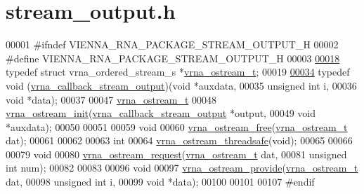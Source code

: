 \hypertarget{stream__output_8h_source}{}\section{stream\+\_\+output.\+h}
\label{stream__output_8h_source}

\begin{DoxyCode}
00001 \textcolor{preprocessor}{#ifndef VIENNA\_RNA\_PACKAGE\_STREAM\_OUTPUT\_H}
00002 \textcolor{preprocessor}{#define VIENNA\_RNA\_PACKAGE\_STREAM\_OUTPUT\_H}
00003 
\mbox{\hyperlink{group__buffer__utils_ga8da189552af21ab6e4e88bdcc240870c}{00018}} \textcolor{keyword}{typedef} \textcolor{keyword}{struct }vrna\_ordered\_stream\_s *\mbox{\hyperlink{group__buffer__utils_ga8da189552af21ab6e4e88bdcc240870c}{vrna\_ostream\_t}};
00019 
\mbox{\hyperlink{group__buffer__utils_ga4adb94338a6f0a1a451e03c1bdac0d9d}{00034}} \textcolor{keyword}{typedef} void (\mbox{\hyperlink{group__buffer__utils_ga4adb94338a6f0a1a451e03c1bdac0d9d}{vrna\_callback\_stream\_output}})(\textcolor{keywordtype}{void}         *auxdata,
00035                                            \textcolor{keywordtype}{unsigned} \textcolor{keywordtype}{int} i,
00036                                            \textcolor{keywordtype}{void}         *data);
00037 
00047 \mbox{\hyperlink{group__buffer__utils_ga8da189552af21ab6e4e88bdcc240870c}{vrna\_ostream\_t}}
00048 \mbox{\hyperlink{group__buffer__utils_gad23113e66a0910ec2341856e2da56bf6}{vrna\_ostream\_init}}(\mbox{\hyperlink{group__buffer__utils_ga4adb94338a6f0a1a451e03c1bdac0d9d}{vrna\_callback\_stream\_output}} *output,
00049                   \textcolor{keywordtype}{void}                        *auxdata);
00050 
00051 
00059 \textcolor{keywordtype}{void}
00060 \mbox{\hyperlink{group__buffer__utils_gaf813ec90e1446ba82c89f9a39688a3b3}{vrna\_ostream\_free}}(\mbox{\hyperlink{group__buffer__utils_ga8da189552af21ab6e4e88bdcc240870c}{vrna\_ostream\_t}} dat);
00061 
00062 
00063 \textcolor{keywordtype}{int}
00064 \mbox{\hyperlink{group__buffer__utils_ga4e60fb5548f6b56003860aa046a74ee2}{vrna\_ostream\_threadsafe}}(\textcolor{keywordtype}{void});
00065 
00066 
00079 \textcolor{keywordtype}{void}
00080 \mbox{\hyperlink{group__buffer__utils_gaebca91932705d71bcbf00bd8d82bd7c8}{vrna\_ostream\_request}}(\mbox{\hyperlink{group__buffer__utils_ga8da189552af21ab6e4e88bdcc240870c}{vrna\_ostream\_t}} dat,
00081                      \textcolor{keywordtype}{unsigned} \textcolor{keywordtype}{int}   num);
00082 
00083 
00096 \textcolor{keywordtype}{void}
00097 \mbox{\hyperlink{group__buffer__utils_ga6253c42abdeaf3b41a38204865e1f0f7}{vrna\_ostream\_provide}}(\mbox{\hyperlink{group__buffer__utils_ga8da189552af21ab6e4e88bdcc240870c}{vrna\_ostream\_t}} dat,
00098                      \textcolor{keywordtype}{unsigned} \textcolor{keywordtype}{int}   i,
00099                      \textcolor{keywordtype}{void}           *data);
00100 
00101 
00107 \textcolor{preprocessor}{#endif}
\end{DoxyCode}
